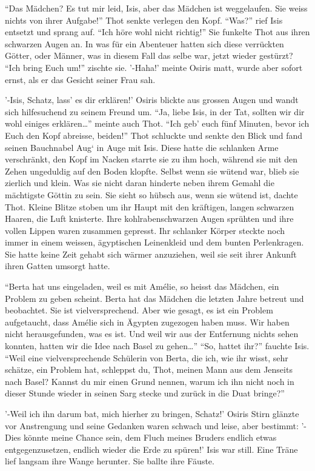 \documentclass[11pt,titlepage,a5paper]{book}
\begin{document}
 "`Das Mädchen? Es tut mir leid, Isis, aber das Mädchen ist weggelaufen. Sie weiss nichts von ihrer Aufgabe!"' Thot senkte verlegen den Kopf. "`Was?"' rief Isis entsetzt und sprang auf. "`Ich höre wohl nicht richtig!"' Sie funkelte Thot aus ihren schwarzen Augen an. In was für ein Abenteuer hatten sich diese verrückten Götter, oder Männer, was in diesem Fall das selbe war, jetzt wieder gestürzt? "`Ich bring Euch um!"' zischte sie. '-Haha!' meinte Osiris matt, wurde aber sofort ernst, als er das Gesicht seiner Frau sah. 
 
'-Isis, Schatz, lass' es dir erklären!' Osiris blickte aus grossen Augen und wandt sich hilfesuchend zu seinem Freund um. "`Ja, liebe Isis, in der Tat, sollten wir dir wohl einiges erklären\dots"' meinte auch Thot. "`Ich geb' euch fünf Minuten, bevor ich Euch den Kopf abreisse, beiden!"' Thot schluckte und senkte den Blick und fand seinen Bauchnabel Aug` in Auge mit Isis. Diese hatte die schlanken Arme verschränkt, den Kopf im Nacken starrte sie zu ihm hoch, während sie mit den Zehen ungeduldig auf den Boden klopfte. Selbst wenn sie wütend war, blieb sie zierlich und klein. Was sie nicht daran hinderte neben ihrem Gemahl die mächtigste Göttin zu sein. Sie sieht so hübsch aus, wenn sie wütend ist, dachte Thot. Kleine Blitze stoben um ihr Haupt mit den kräftigen, langen schwarzen Haaren, die Luft knisterte. Ihre kohlrabenschwarzen Augen sprühten und ihre vollen Lippen waren zusammen gepresst. Ihr schlanker Körper steckte noch immer in einem weissen, ägyptischen Leinenkleid und dem bunten Perlenkragen. Sie hatte keine Zeit gehabt sich wärmer anzuziehen, weil sie seit ihrer Ankunft ihren Gatten umsorgt hatte.
 
"`Berta hat uns eingeladen, weil es mit Amélie, so heisst das Mädchen, ein Problem zu geben scheint. Berta hat das Mädchen die letzten Jahre betreut und beobachtet. Sie ist vielversprechend. Aber wie gesagt, es ist ein Problem aufgetaucht, dass Amélie sich in Ägypten zugezogen haben muss. Wir haben nicht herausgefunden, was es ist. Und weil wir aus der Entfernung nichts sehen konnten, hatten wir die Idee nach Basel zu gehen\dots"' "`So, hattet ihr?"' fauchte Isis. "`Weil eine vielversprechende Schülerin von Berta, die ich, wie ihr wisst, sehr schätze, ein Problem hat, schleppst du, Thot, meinen Mann aus dem Jenseits nach Basel? Kannst du mir einen Grund nennen, warum ich ihn nicht noch in dieser Stunde wieder in seinen Sarg stecke und zurück in die Duat bringe?"'

 '-Weil ich ihn darum bat, mich hierher zu bringen, Schatz!' Osiris Stirn glänzte vor Anstrengung und seine Gedanken waren schwach und leise, aber bestimmt: '-Dies könnte meine Chance sein, dem Fluch meines Bruders endlich etwas entgegenzusetzen, endlich wieder die Erde zu spüren!' Isis war still. Eine Träne lief langsam ihre Wange herunter. Sie ballte ihre Fäuste.
 
\end{document}
